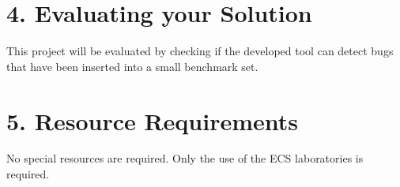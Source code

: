 \documentclass[11pt, a4paper, twoside, openright]{report}
\begin{document}
%
%
%
%

\section*{4. Evaluating your Solution}

This project will be evaluated by checking if the developed tool can detect bugs that have been inserted into a small benchmark set.


\section*{5. Resource Requirements}

No special resources are required. Only the use of the ECS laboratories is required.




%
%
%
\end{document}
